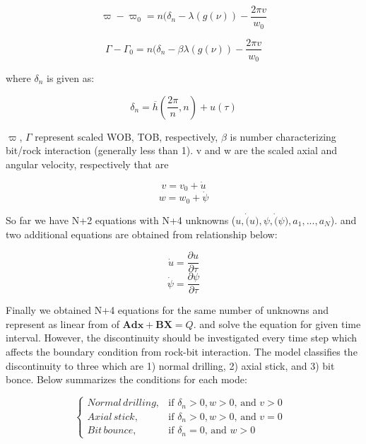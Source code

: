 \begin{equation}\label{GE1}
  \varpi-\varpi_0 = n(\delta_n - \lambda(g(\nu)) - \frac{2\pi v}{w_0}
\end{equation}

\begin{equation}\label{GE2}
  \Gamma-\Gamma_0 = n(\delta_n -\beta \lambda(g(\nu)) - \frac{2\pi v}{w_0}
\end{equation}

where $\delta_n$ is given as:

\begin{equation}\label{deltan1}
  \delta_n = \overline{h}\left(\frac{2\pi}{n}, n\right) + u(\tau)
\end{equation}

$\varpi$, $\Gamma$ represent scaled WOB, TOB, respectively,  $\beta$ is number characterizing bit/rock interaction (generally less than 1). v and w are the scaled axial and angular velocity, respectively that are

\begin{equation}\label{scaled_axial_ve}
  v = v_0 + \dot{u}
\end{equation}
\begin{equation}\label{scaled_angular_vel}
  w = w_0 + \dot{\psi}
\end{equation}

So far we have N+2 equations with N+4 unknowns ($u, \dot(u), \psi, \dot(\psi), a_1, ..., a_N$). and two additional equations are obtained from relationship below:

\begin{equation}\label{axial_dis_vel}
  \dot{u} = \frac{\partial u}{\partial \tau}
\end{equation}
\begin{equation}\label{angular_dis_vel}
  \dot{\psi} = \frac{\partial \psi}{\partial \tau}
\end{equation}

Finally we obtained N+4 equations for the same number of unknowns and represent as linear from of $\bm{Adx} + \bm{BX} = Q$. and solve the equation for given time interval. However, the discontinuity should be investigated every time step which affects the boundary condition from rock-bit interaction. The model classifies the discontinuity to three which are 1) normal drilling, 2) axial stick, and 3) bit bonce. Below summarizes the conditions for each mode:

\begin{equation}\label{drillingmodes}
  \begin{cases}
    Normal\,drilling, & \mbox{if $\delta_n > 0, w > 0$, and $v > 0$ }  \\
    Axial\, stick, & \mbox{if $\delta_n >0, w > 0$, and $v = 0$ } \\
    Bit\,bounce, & \mbox{if $\delta_n = 0$, and $w > 0$}
  \end{cases}
\end{equation}

